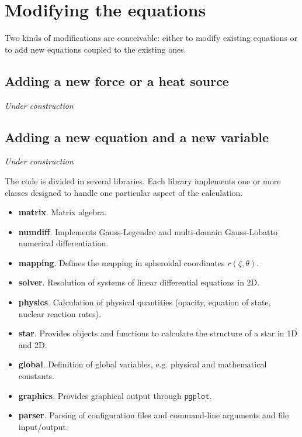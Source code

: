 \section{Modifying the equations}

Two kinds of modifications are conceivable: either to modify existing
equations or to add new equations coupled to the existing ones.

\subsection{Adding a new force or a heat source}

{\it Under construction}

\subsection{Adding a new equation and a new variable}

{\it Under construction}

\bigskip
\bigskip
The code is divided in several libraries. Each library implements one or
more classes designed to handle one particular aspect of the calculation.

\begin{itemize}
\item {\bf matrix}. Matrix algebra.

\item {\bf numdiff}. Implements Gauss-Legendre and multi-domain
Gauss-Lobatto numerical differentiation.

\item {\bf mapping}. Defines the mapping in spheroidal coordinates
$r(\zeta,\theta)$.

\item {\bf solver}. Resolution of systems of linear differential equations
in 2D.

\item {\bf physics}. Calculation of physical quantities (opacity,
equation of state, nuclear reaction rates).

\item {\bf star}. Provides objects and functions to calculate the
structure of a star in 1D and 2D.

\item {\bf global}. Definition of global variables, e.g. physical and mathematical constants.

\item {\bf graphics}. Provides graphical output through {\tt pgplot}.
\item {\bf parser}. Parsing of configuration files and command-line
arguments and file input/output.

\end{itemize} 


